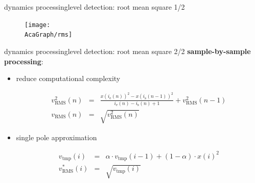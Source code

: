 \begin{frame}{dynamics processing}{level detection: root mean square 1/2}
	\begin{equation*}\label{eq:rms}
		
	\end{equation*}
	\begin{figure}
		\texttt{[image: \\AcaGraph/rms]}
	\end{figure}
\end{frame}
\begin{frame}{dynamics processing}{level detection: root mean square 2/2}
			\textbf{sample-by-sample processing}:
			\begin{itemize}
				\item	reduce computational complexity
					\begin{footnotesize}
					\begin{eqnarray*}
						v^2_{\mathrm{RMS}}(n) &=& \frac{x(i_{\mathrm{e}}(n))^2 - x(i_{\mathrm{s}}(n-1))^2}{i_{\mathrm{e}}(n)-i_{\mathrm{s}}(n) + 1} + v^2_{\mathrm{RMS}}(n-1) \\
						v_{\mathrm{RMS}}(n)	&=& \sqrt{v^2_{\mathrm{RMS}}(n)}
					\end{eqnarray*}
					\end{footnotesize}
				\pause
				\item	single pole approximation
					\begin{footnotesize}
					\begin{eqnarray*}
						v_\mathrm{tmp}(i)	&=& \alpha\cdot v_\mathrm{tmp}(i-1) + (1-\alpha)\cdot x(i)^2\\
						v^*_{\mathrm{RMS}}(i)		&=& \sqrt{v_\mathrm{tmp}(i)}
					\end{eqnarray*}
					\end{footnotesize}
			\end{itemize}
\end{frame}
